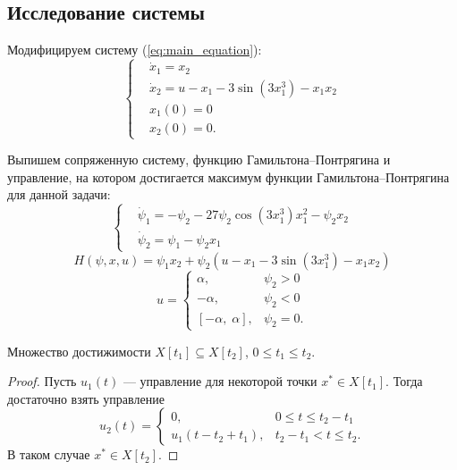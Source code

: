 \subsection{Исследование системы}

Модифицируем систему (\ref{eq:main_equation}):
\begin{equation} \label{eq:main_system}
        \left\{
        \begin{aligned}
                & \dot x_1 = x_2 \\
                & \dot x_2 = u - x_1 - 3 \sin(3x_1^3) - x_1 x_2 \\
                & x_1(0) = 0 \\
                & x_2(0) = 0.
        \end{aligned}
        \right.
\end{equation}

Выпишем сопряженную систему, функцию Гамильтона--Понтрягина и управление, на котором достигается максимум функции Гамильтона--Понтрягина для данной задачи:
\begin{equation} \label{eq:congugate_system}
        \left\{
        \begin{aligned}
                & \dot\psi_1 = -\psi_2 - 27\psi_2\cos(3x_1^3)x_1^2 - \psi_2 x_2 \\
                & \dot \psi_2 = \psi_1 - \psi_2 x_1
        \end{aligned}
        \right.
\end{equation}
\begin{equation}
        H(\psi, x, u) = \psi_1 x_2 + \psi_2(u - x_1 - 3\sin(3x_1^3) - x_1x_2)
\end{equation}
\begin{equation}
        u = 
        \begin{cases}
                \alpha, &\psi_2 > 0 \\
                -\alpha, &\psi_2 < 0 \\
                [-\alpha,\;\alpha], &\psi_2 = 0.
        \end{cases}
\end{equation}

\begin{assertion}
        Множество достижимости $X[t_1] \subseteq X[t_2]$, $0 \leqslant t_1 \leqslant t_2$.
\end{assertion}
\begin{proof}
        Пусть $u_1(t)$ --- управление для некоторой точки  $x^* \in X[t_1]$. Тогда достаточно взять управление
        $$
                u_2(t) = 
                \begin{cases}
                        0, & 0 \leqslant t \leqslant t_2 - t_1 \\
                        u_1(t - t_2 + t_1), & t_2 - t_1 < t \leqslant t_2.
                \end{cases}
        $$
        В таком случае $x^* \in X[t_2]$.
\end{proof}

